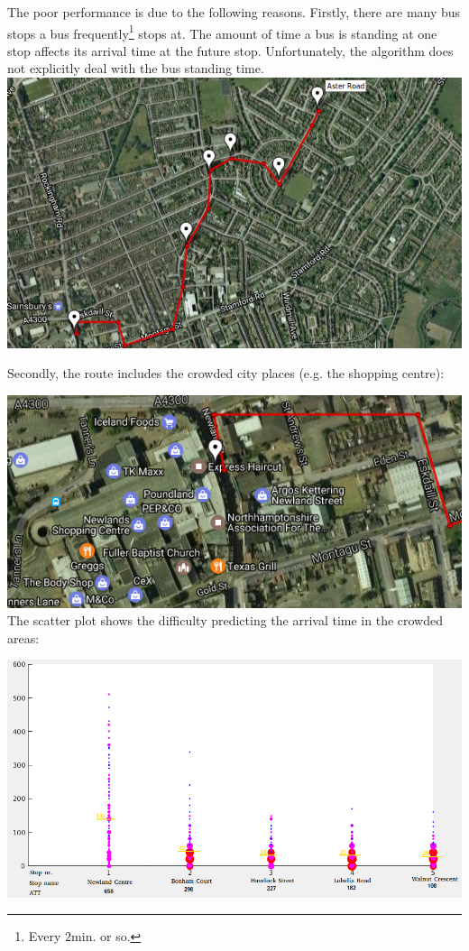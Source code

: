 \documentclass[12pt,a4paper,oneside,openright]{report}
\begin{document}
The poor performance is due to the following reasons. Firstly, there are many bus stops a bus
frequently\footnote{Every $2$min. or so.} stops at. The amount of time a bus is standing at one
stop affects its arrival time at the future stop. Unfortunately, the algorithm does not explicitly
deal with the bus standing time. \\

\includegraphics[scale=0.8]{figs/worst_route.png} \\

\newpage

Secondly, the route includes the crowded city places (e.g. the shopping centre):

\:

\includegraphics[scale=0.6]{figs/shopping_centre.png} \\

The scatter plot shows the difficulty predicting the arrival time in the crowded areas:

\includegraphics[width=\textwidth]{figs/worst_scatter_plot.png}
\end{document}
